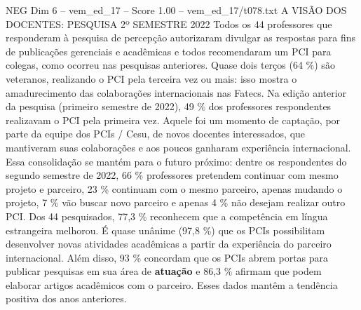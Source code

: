 \begin{textsample}{NEG Dim 6 – vem\_ed\_17 – Score 1.00 – vem\_ed\_17/t078.txt}  \label{ex:f6_neg_120}
A VISÃO DOS DOCENTES: PESQUISA 2º SEMESTRE 2022 Todos os 44 professores que responderam à pesquisa de percepção autorizaram divulgar as respostas para fins de publicações gerenciais e acadêmicas e todos recomendaram um PCI para colegas, como ocorreu nas pesquisas anteriores.
Quase dois terços (64 \%) são veteranos, realizando o PCI pela terceira vez ou mais: isso mostra o amadurecimento das colaborações internacionais nas Fatecs.
Na edição anterior da pesquisa (primeiro semestre de 2022), 49 \% dos professores respondentes realizavam o PCI pela primeira vez.
Aquele foi um momento de captação, por parte da equipe dos PCIs / Cesu, de novos docentes interessados, que mantiveram suas colaborações e aos poucos ganharam experiência internacional.
Essa consolidação se mantém para o futuro próximo: dentre os respondentes do segundo semestre de 2022, 66 \% professores pretendem continuar com mesmo projeto e parceiro, 23 \% continuam com o mesmo parceiro, apenas mudando o projeto, 7 \% vão buscar novo parceiro e apenas 4 \% não desejam realizar outro PCI.
Dos 44 pesquisados, 77,3 \% reconhecem que a competência em língua estrangeira melhorou.
É quase unânime (97,8 \%) que os PCIs possibilitam desenvolver novas atividades acadêmicas a partir da experiência do parceiro internacional.
Além disso, 93 \% concordam que os PCIs abrem portas para publicar pesquisas em sua área de \textbf{atuação} e 86,3 \% afirmam que podem elaborar artigos acadêmicos com o parceiro.
Esses dados mantêm a tendência positiva dos anos anteriores.

\end{textsample}
